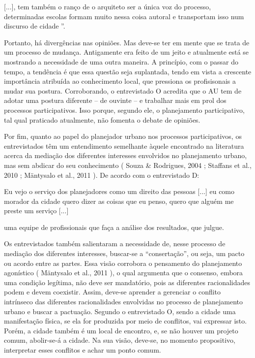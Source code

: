 \documentclass{article}
\begin{document}
					[...], %
tem também o ranço de o arquiteto ser a única voz do processo,
						determinadas escolas formam muito nessa coisa autoral e transportam isso num
						discurso de cidade%
”.

Portanto, há divergências nas opiniões. Mas deve-se ter em mente que se trata de
					um processo de mudança. Antigamente era feito de um jeito e atualmente está se
					mostrando a necessidade de uma outra maneira. A princípio, com o passar do
					tempo, a tendência é que essa questão seja suplantada, tendo em vista a
					crescente importância atribuída ao conhecimento local, que pressiona os
					profisisonais a mudar sua postura. Corroborando, o entrevistado O acredita que o
					AU tem de adotar uma postura diferente – de ouvinte – e trabalhar mais em prol
					dos processos participativos. Isso porque, segundo ele, o planejamento
					participativo, tal qual praticado atualmente, não fomenta o debate de
					opiniões.

Por fim, quanto ao papel do planejador urbano nos processos participativos, os
					entrevistados têm um entendimento semelhante àquele encontrado na literatura
					acerca da mediação dos diferentes interesses envolvidos no planejamento urbano,
					mas sem abdicar do seu conhecimento (%
Souza
						\& Rodrigues, 2004%
; %
Staffans et
						al., 2010%
; %
Mäntysalo et al.,
						2011%
). De acordo com o entrevistado D: 

Eu vejo o serviço dos planejadores como um direito das pessoas
[...]%
 eu como morador da cidade quero dizer as coisas
						que eu penso, quero que alguém me preste um serviço %
[...]%

						uma equipe de profissionais que faça a análise dos resultados, que
						julgue.

Os entrevistados também salientaram a necessidade de, nesse processo de mediação
					dos diferentes interesses, buscar-se a “consertação”, ou seja, um pacto ou
					acordo entre as partes. Essa visão corrobora o pensamento do planejamento
					agonístico (%
Mäntysalo et al., 2011%
), o
					qual argumenta que o consenso, embora uma condição legítima, não deve ser
					mandatório, pois as diferentes racionalidades podem e devem coexistir. Assim,
					deve-se aprender a gerenciar o conflito intrínseco das diferentes racionalidades
					envolvidas no processo de planejamento urbano e buscar a pactuação. Segundo o
					entrevistado O, sendo a cidade uma manifestação física, se ela for produzida por
					meio de conflitos, vai expressar isto. Porém, a cidade também é um local de
					encontro, e, se não houver um projeto comum, abolir-se-á a cidade. Na sua visão,
					deve-se, no momento propositivo, interpretar esses conflitos e achar um ponto
					comum.
\end{document}
